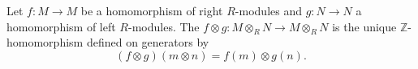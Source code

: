 Let $f: M \to M$ be a homomorphism of right $R$-modules and $g: N \to N$ a homomorphism of left $R$-modules. The  $f \otimes g: M \otimes_R N \to M \otimes_R N$ is the unique $\mathbb{Z}$-homomorphism defined on generators by
$$(f \otimes g)(m \otimes n) = f(m) \otimes g(n).$$
